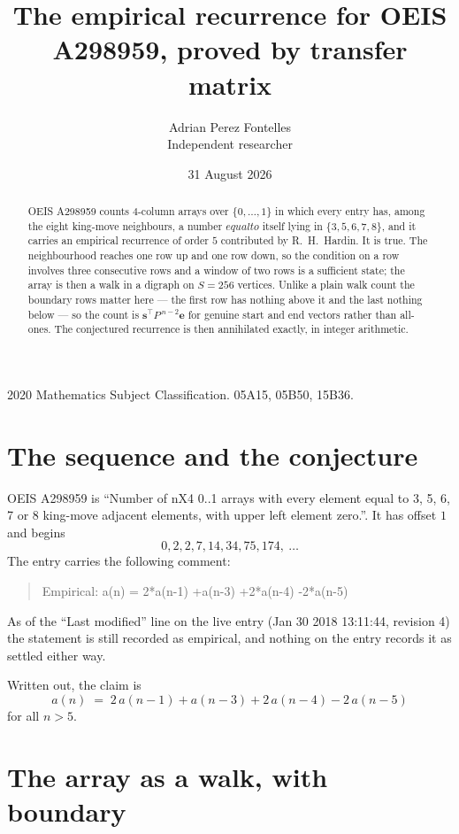 \documentclass[11pt,a4paper]{article}
\title{The empirical recurrence for OEIS A298959, proved by transfer matrix}
\author{Adrian Perez Fontelles\\ \small Independent researcher}
\date{31 August 2026}
\theoremstyle{plain}
\theoremstyle{definition}
\begin{document}
\maketitle

\begin{abstract}
OEIS A298959 counts $4$-column arrays over $\{0,\dots,1\}$ in which every entry has,
among the eight king-move neighbours, a number $equal to$ itself lying in $\{3,5,6,7,8\}$, and it carries an empirical
recurrence of order $5$ contributed by R.~H.~Hardin. It is true. The neighbourhood
reaches one row up and one row down, so the condition on a row involves three consecutive
rows and a window of two rows is a sufficient state; the array is then a walk in a digraph
on $S=256$ vertices. Unlike a plain walk count the boundary rows matter here --- the first
row has nothing above it and the last nothing below --- so the count is
$\mathbf{s}^{\!\top}P^{\,n-2}\mathbf{e}$ for genuine start and end vectors rather than
all-ones. The conjectured recurrence is then annihilated exactly, in integer arithmetic.
\end{abstract}

\noindent\small 2020 Mathematics Subject Classification. 05A15, 05B50, 15B36.\normalsize

\section{The sequence and the conjecture}

OEIS A298959 is ``Number of nX4 0..1 arrays with every element equal to 3, 5, 6, 7 or 8 king-move adjacent elements, with upper left element zero.''. It has offset
$1$ and begins
\[
0, 2, 2, 7, 14, 34, 75, 174,\ \dots
\]
The entry carries the following comment:
\begin{quote}\small
Empirical: a(n) = 2*a(n-1) +a(n-3) +2*a(n-4) -2*a(n-5)
\end{quote}
As of the ``Last modified'' line on the live entry (Jan 30 2018 13:11:44, revision
4) the statement is still recorded as empirical, and nothing on the entry
records it as settled either way.

Written out, the claim is
\begin{equation}\label{eq:conj}
a(n)\;=\;2\,a(n-1) + a(n-3) + 2\,a(n-4) - 2\,a(n-5)
\end{equation}
for all $n>5$.

\section{The array as a walk, with boundary}
\end{document}
